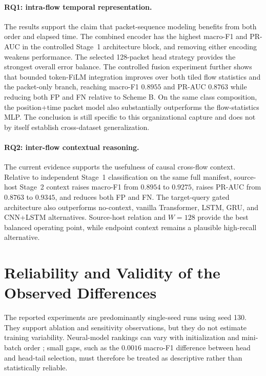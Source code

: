 \paragraph{RQ1: intra-flow temporal representation.}
The results support the claim that packet-sequence modeling benefits from both
order and elapsed time. The combined encoder has the highest macro-F1 and
PR-AUC in the controlled Stage~1 architecture block, and removing either
encoding weakens performance. The selected 128-packet head strategy provides
the strongest overall error balance. The controlled fusion experiment further
shows that bounded token-FiLM integration improves over both tiled flow
statistics and the packet-only branch, reaching macro-F1 $0.8955$ and PR-AUC
$0.8763$ while reducing both FP and FN relative to Scheme B. On the same class
composition, the position+time packet model also substantially outperforms the
flow-statistics MLP. The conclusion is still specific to this organizational
capture and does not by itself establish cross-dataset generalization.

\paragraph{RQ2: inter-flow contextual reasoning.}
The current evidence supports the usefulness of causal cross-flow context.
Relative to independent Stage~1 classification on the same full manifest,
source-host Stage~2 context raises macro-F1 from $0.8954$ to $0.9275$, raises
PR-AUC from $0.8763$ to $0.9345$, and reduces both FP and FN. The target-query
gated architecture also outperforms no-context, vanilla Transformer, LSTM,
GRU, and CNN+LSTM alternatives. Source-host relation and $W=128$ provide the
best balanced operating point, while endpoint context remains a plausible
high-recall alternative.

\section{Reliability and Validity of the Observed Differences}
\label{subsec:results_reliability}

The reported experiments are predominantly single-seed runs using seed 130.
They support ablation and sensitivity observations, but they do not estimate
training variability. Neural-model rankings can vary with initialization and
mini-batch order \cite{ReimersGurevych2017,Bouthillier2021Variance}; small gaps,
such as the $0.0016$ macro-F1 difference between head and head-tail selection,
must therefore be treated as descriptive rather than statistically reliable.

